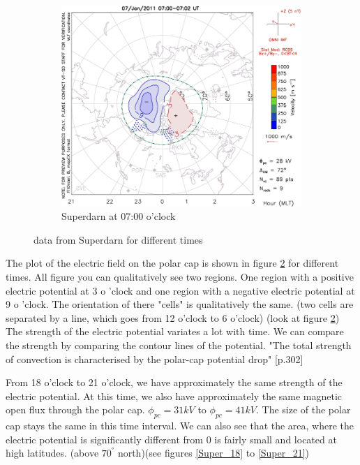 \documentclass[10pt,a4paper]{article}
\begin{document}
\begin{figure}[h]
\begin{subfigure}{0.3\textwidth}
	\includegraphics[width=\textwidth]{Superdarn14.jpg}
	\caption{ Superdarn at 07:00 o'clock \label{Super_07}}
\end{subfigure}
\caption{data from Superdarn for different times}
\label{Super_overview}
\end{figure}
The plot of the electric field on the polar cap is shown in figure \ref{Super_overview} for different times. 
All figure you can qualitatively see two regions. One region with a positive electric potential at 3 o 'clock and one region with a negative electric potential at 9 o 'clock. 
The orientation of there "cells" is qualitatively the same. (two cells are separated by a line, which goes from 12 o'clock to 6 o'clock) (look at figure \ref{Super_overview}) 
The strength of the electric potential variates a lot with time. We can compare the strength by comparing the contour lines of the potential. "The total strength of convection is characterised by the polar-cap potential drop" \cite{Buch2}[p.302]

From 18 o'clock to 21 o'clock, we have approximately the same strength of the electric potential. At this time, we also have approximately the same magnetic open flux through the polar cap. $\phi_{pc}=31kV$ to $\phi_{pc}=41 k V $. The size of the polar cap stays the same in this time interval. We can also see that the area, where the electric potential is significantly different from 0 is fairly small and located at high latitudes. (above $70^{°}$ north)(see figures \ref{Super_18} to \ref{Super_21})
\end{document}
